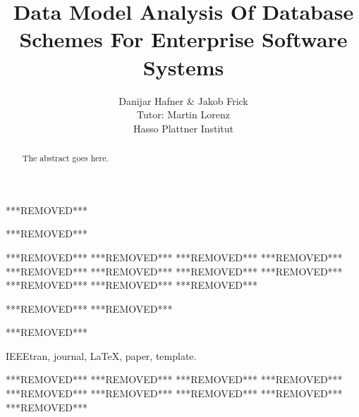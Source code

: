 \documentclass[10pt, journal, twocolumn]{IEEEtran}
\begin{document}
%
\title{Data Model Analysis Of Database Schemes For Enterprise Software Systems}
%
%
%
***REMOVED***
\author{Danijar Hafner \& Jakob Frick\\Tutor: Martin Lorenz\\Hasso Plattner Institut}%
***REMOVED***
% 
***REMOVED***
***REMOVED***
***REMOVED***
***REMOVED***
***REMOVED***
***REMOVED***
***REMOVED***
***REMOVED***
***REMOVED***
***REMOVED***
***REMOVED***
\maketitle
***REMOVED***
***REMOVED***
\begin{abstract}
The abstract goes here.
\end{abstract}
***REMOVED***
\begin{IEEEkeywords}
IEEEtran, journal, \LaTeX, paper, template.
\end{IEEEkeywords}
***REMOVED***
***REMOVED***
***REMOVED***
***REMOVED***
***REMOVED***
***REMOVED***
%
\IEEEpeerreviewmaketitle
***REMOVED***
***REMOVED***
***REMOVED***
\end{document}
